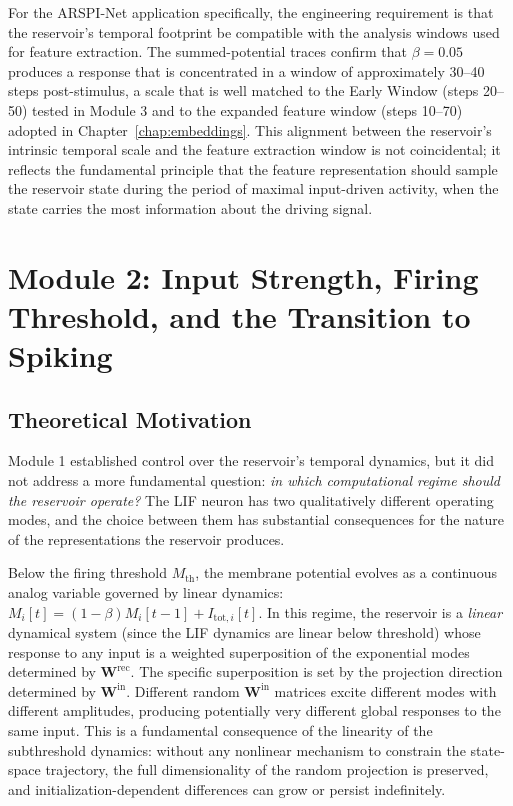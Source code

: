 For the ARSPI-Net application specifically, the engineering requirement is that the reservoir's temporal footprint be compatible with the analysis windows used for feature extraction. The summed-potential traces confirm that $\beta = 0.05$ produces a response that is concentrated in a window of approximately 30--40 steps post-stimulus, a scale that is well matched to the Early Window (steps 20--50) tested in Module 3 and to the expanded feature window (steps 10--70) adopted in Chapter~\ref{chap:embeddings}. This alignment between the reservoir's intrinsic temporal scale and the feature extraction window is not coincidental; it reflects the fundamental principle that the feature representation should sample the reservoir state during the period of maximal input-driven activity, when the state carries the most information about the driving signal.


\section{Module 2: Input Strength, Firing Threshold, and the Transition to Spiking}
\label{sec:module2}

\subsection{Theoretical Motivation}

Module 1 established control over the reservoir's temporal dynamics, but it did not address a more fundamental question: \emph{in which computational regime should the reservoir operate?} The LIF neuron has two qualitatively different operating modes, and the choice between them has substantial consequences for the nature of the representations the reservoir produces.

Below the firing threshold $M_{\text{th}}$, the membrane potential evolves as a continuous analog variable governed by linear dynamics: $M_i[t] = (1 - \beta) M_i[t-1] + I_{\text{tot},i}[t]$. In this regime, the reservoir is a \emph{linear} dynamical system (since the LIF dynamics are linear below threshold) whose response to any input is a weighted superposition of the exponential modes determined by $\mathbf{W}^{\text{rec}}$. The specific superposition is set by the projection direction determined by $\mathbf{W}^{\text{in}}$. Different random $\mathbf{W}^{\text{in}}$ matrices excite different modes with different amplitudes, producing potentially very different global responses to the same input. This is a fundamental consequence of the linearity of the subthreshold dynamics: without any nonlinear mechanism to constrain the state-space trajectory, the full dimensionality of the random projection is preserved, and initialization-dependent differences can grow or persist indefinitely.

